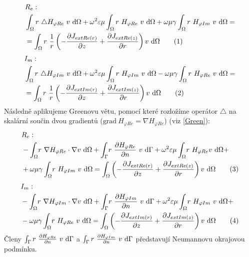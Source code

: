 \documentclass[12pt,a4paper,oneside]{article}
\numberwithin{equation}{section} %
\numberwithin{figure}{section} %
\numberwithin{table}{section} %
\newcommand{\grad}{\mathrm{grad}\ }
\newcommand\numberthis{\addtocounter{equation}{1}\tag{\theequation}}
\begin{document}
\begin{align*}
&R_e:
\\
&\int _{\Omega} r ~ \triangle H _{\varphi Re} ~ v ~ \ud \Omega + \omega ^2 \varepsilon \mu \int _{\Omega} r ~ H _{\varphi Re} ~ v ~ \ud \Omega + \omega \mu \gamma \int _{\Omega} r ~ H _{\varphi Im} ~ v ~ \ud \Omega = 
\\
&= \int _{\Omega} r ~ \frac{1}{r} \left( - \frac{\partial J _{extRe(r)}}{\partial z} + \frac{\partial J _{extRe(z)}}{\partial r} \right) v ~ \ud \Omega
\numberthis
\end{align*}
\begin{align*}
&I_m:
\\
&\int _{\Omega} r ~ \triangle H _{\varphi Im} ~ v ~ \ud \Omega + \omega ^2 \varepsilon \mu \int _{\Omega} r ~ H _{\varphi Im} ~ v ~ \ud \Omega - \omega \mu \gamma \int _{\Omega} r ~ H _{\varphi Re} ~ v ~ \ud \Omega = 
\\
&= \int _{\Omega} r ~ \frac{1}{r} \left( - \frac{\partial J _{extIm(r)}}{\partial z} + \frac{\partial J _{extIm(z)}}{\partial r} \right) v ~ \ud \Omega
\numberthis
\end{align*}
Následně aplikujeme Greenovu větu, pomocí které rozložíme operátor $\triangle$ na skalární součin dvou gradientů ($\grad H _{\varphi Re} = \nabla H _{\varphi Re}$) (viz \ref{Green}):
\begin{align*}
&R_e:
\\
&- \int _{\Omega} \! r ~ \nabla H _{\varphi Re} \cdot \nabla v ~ \ud \Omega + \int _{\Gamma} \! r ~ \frac{\partial H _{\varphi Re}}{\partial n} ~ v ~ \ud \Gamma + \omega ^2 \varepsilon \mu \int _{\Omega} \! r ~ H _{\varphi Re} v ~ \ud \Omega +\\
& + \omega \mu \gamma \int _{\Omega} \! r ~ H _{\varphi Im} ~ v ~ \ud \Omega = \int _{\Omega} \left( - \frac{\partial J _{extRe(r)}}{\partial z} + \frac{\partial J _{extRe(z)}}{\partial r} \right) v ~ \ud \Omega
\numberthis
\end{align*}
\begin{align*}
&I_m:
\\
&- \int _{\Omega} \! r ~ \nabla H _{\varphi Im} \cdot \nabla v ~ \ud \Omega + \int _{\Gamma} \! r ~ \frac{\partial H _{\varphi Im}}{\partial n} ~ v ~ \ud \Gamma + \omega ^2 \varepsilon \mu \int _{\Omega} \! r ~ H _{\varphi Im} ~ v ~ \ud \Omega +\\
& - \omega \mu \gamma \int _{\Omega} \! r ~ H _{\varphi Re} ~ v ~ \ud \Omega = \int _{\Omega} \left( - \frac{\partial J _{extIm(r)}}{\partial z} + \frac{\partial J _{extIm(z)}}{\partial r} \right) v ~ \ud \Omega
\numberthis
\end{align*}
Členy $\int _{\Gamma} r ~ \frac{\partial H _{\varphi Re}}{\partial n} ~ v ~ \mathrm{d} \Gamma$ a $\int _{\Gamma} r ~ \frac{\partial H _{\varphi Im}}{\partial n} ~ v ~ \mathrm{d} \Gamma$ představují Neumannovu okrajovou podmínku.
\end{document}
